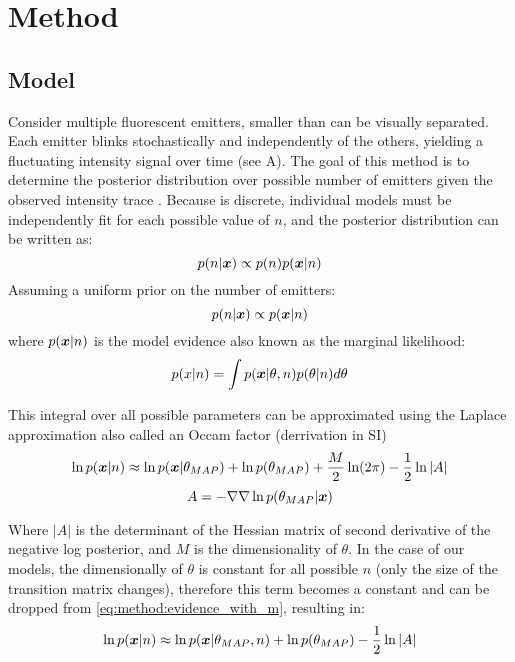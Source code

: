 \section{Method}

\subsection{Model}
Consider multiple fluorescent emitters, smaller than can be visually separated.
%
Each emitter blinks stochastically and independently of the others, 
yielding a fluctuating intensity signal over time (see  A).
%
The goal of this method is to determine the posterior distribution over 
possible number of emitters \ndist given the observed intensity trace \trace.
%
Because \ndist is discrete, individual models must be independently fit 
for each possible value of $n$, and the posterior distribution can be written as:
% 
\begin{equation*}
  p(n | \bm{x}) \propto p(n) p(\bm{x} | n)
\end{equation*}
%
Assuming a uniform prior on the number of emitters:
\begin{equation*}
  p(n | \bm{x}) \propto p(\bm{x} | n)
\end{equation*}
%
where $p(\bm{x}|n)$ is the model evidence also known as the marginal likelihood:
\begin{equation*}
  p(x | n) = \int p(\bm{x} | \theta, n) p(\theta | n) d\theta
\end{equation*}

This integral over all possible parameters can be approximated using the 
Laplace approximation also called an Occam factor (derrivation in SI)
\begin{equation}
  \ln p(\bm{x} | n) \approx \ln p(\bm{x} | \theta_{MAP}) + \ln p(\theta_{MAP}) + \frac{M}{2} \ln(2\pi) - \frac{1}{2} \ln |A|
  \label{eq:method:evidence_with_m}
\end{equation}
\begin{equation*}
  A = -\nabla \nabla \ln p(\theta_{MAP} | \bm{x})
\end{equation*}

%
Where $|A|$ is the determinant of the Hessian matrix of second derivative
of the negative log posterior, and $M$ is the dimensionality of $\theta$. 
%
In the case of our models, the dimensionally of $\theta$ is constant 
for all possible $n$ (only the size of the transition matrix changes),
therefore this term becomes a constant and can be dropped from 
\eqref{eq:method:evidence_with_m}, resulting in:
\begin{equation}
  \ln p(\bm{x} | n) \approx \ln p(\bm{x} | \theta_{MAP}, n) + \ln p(\theta_{MAP}) - \frac{1}{2} \ln |A|
  \label{eq:method:evidence}
\end{equation}

